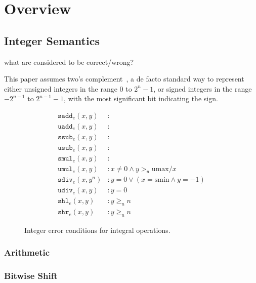 \section{Overview}
\label{s:oview}

\subsection{Integer Semantics}

\newcommand{\smin}{\mathrm{smin}}
\newcommand{\smax}{\mathrm{smax}}
\newcommand{\umax}{\mathrm{umax}}

\newcommand{\sadde}{\mathtt{sadd}_e}
\newcommand{\uadde}{\mathtt{uadd}_e}
\newcommand{\ssube}{\mathtt{ssub}_e}
\newcommand{\usube}{\mathtt{usub}_e}
\newcommand{\smule}{\mathtt{smul}_e}
\newcommand{\umule}{\mathtt{umul}_e}
\newcommand{\sdive}{\mathtt{sdiv}_e}
\newcommand{\udive}{\mathtt{udiv}_e}
\newcommand{\shle}{\mathtt{shl}_e}
\newcommand{\shre}{\mathtt{shr}_e}
\newcommand{\conve}{\mathtt{conv}_e}


what are considered to be correct/wrong?

This paper assumes two's complement~\cite{intel:int}, a de facto
standard way to represent either unsigned integers in the range $0$
to $2^n-1$, or signed integers in the range $-2^{n-1}$ to $2^{n-1}-1$,
with the most significant bit indicating the sign.

\begin{figure}
\begin{align}
\sadde(x, y)&: \\
\uadde(x, y)&: \\
\ssube(x, y)&: \\
\usube(x, y)&: \\
\smule(x, y)&: \\
\umule(x, y)&: x \neq 0 \land y >_u \umax / x \\
\sdive(x, y^n)&: y = 0 \lor (x = \smin \land y = -1) \\
\udive(x, y)&: y = 0 \\
\shle(x, y)&: y \geq_u n \\
\shre(x, y)&: y \geq_u n
\end{align}
\caption{Integer error conditions for integral operations.}
\end{figure}

\subsubsection*{Arithmetic}
\subsubsection*{Bitwise Shift}
